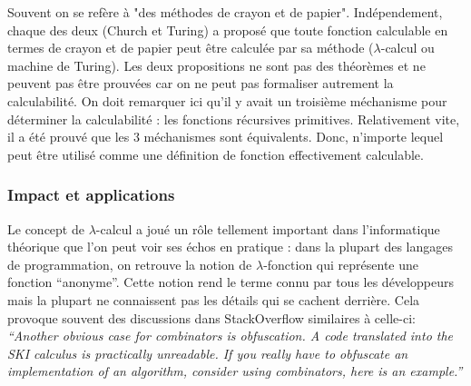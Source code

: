 \documentclass[12pt, a4paper]{article}
\begin{document}
Souvent on se refère à "des méthodes de crayon et de papier". Indépendement, chaque des deux (Church et Turing) a proposé que toute fonction calculable en termes de crayon et de papier peut être calculée par sa méthode ($\lambda$-calcul ou machine de Turing). Les deux propositions ne sont pas des théorèmes et ne peuvent pas être prouvées car on ne peut pas formaliser autrement la calculabilité. On doit remarquer ici qu'il y avait un troisième méchanisme pour déterminer la calculabilité : les fonctions récursives primitives. Relativement vite, il a été prouvé que les 3 méchanismes sont équivalents. Donc, n'importe lequel peut être utilisé comme une définition de fonction effectivement calculable.

\subsubsection*{Impact et applications}
Le concept de $\lambda$-calcul a joué un rôle tellement important dans l'informatique théorique que l'on peut voir ses échos en pratique : dans la plupart des langages de programmation, on retrouve la notion de $\lambda$-fonction qui représente une fonction ``anonyme''.
Cette notion rend le terme connu par tous les développeurs mais la plupart ne connaissent pas les détails qui se cachent derrière.
Cela provoque souvent des discussions dans StackOverflow similaires à celle-ci:
\textit{``Another obvious case for combinators is obfuscation. A code translated into the SKI calculus is practically unreadable. If you really have to obfuscate an implementation of an algorithm, consider using combinators, here is an example.''}
\end{document}
